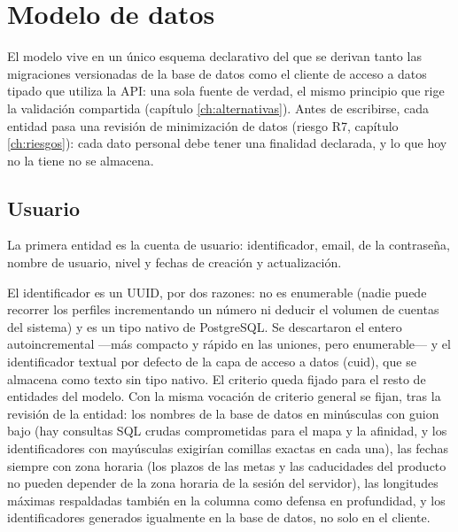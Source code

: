\section{Modelo de datos}
\label{sec:diseno-modelo}

El modelo vive en un único esquema declarativo del que se derivan tanto las migraciones versionadas de la base de datos como el cliente de acceso a datos tipado que utiliza la \ac{API}: una sola fuente de verdad, el mismo principio que rige la validación compartida (capítulo \ref{ch:alternativas}).
Antes de escribirse, cada entidad pasa una revisión de minimización de datos (riesgo R7, capítulo \ref{ch:riesgos}): cada dato personal debe tener una finalidad declarada, y lo que hoy no la tiene no se almacena.

\subsection{Usuario}
\label{sec:diseno-usuario}

La primera entidad es la cuenta de usuario: identificador, email,  de la contraseña, nombre de usuario, nivel y fechas de creación y actualización.

El identificador es un \ac{UUID}, por dos razones: no es enumerable (nadie puede recorrer los perfiles incrementando un número ni deducir el volumen de cuentas del sistema) y es un tipo nativo de PostgreSQL.
Se descartaron el entero autoincremental —más compacto y rápido en las uniones, pero enumerable— y el identificador textual por defecto de la capa de acceso a datos (cuid), que se almacena como texto sin tipo nativo.
El criterio queda fijado para el resto de entidades del modelo.
Con la misma vocación de criterio general se fijan, tras la revisión de la entidad: los nombres de la base de datos en minúsculas con guion bajo (hay consultas \acs{SQL} crudas comprometidas para el mapa y la afinidad, y los identificadores con mayúsculas exigirían comillas exactas en cada una), las fechas siempre con zona horaria (los plazos de las metas y las caducidades del producto no pueden depender de la zona horaria de la sesión del servidor), las longitudes máximas respaldadas también en la columna como defensa en profundidad, y los identificadores generados igualmente en la base de datos, no solo en el cliente.

